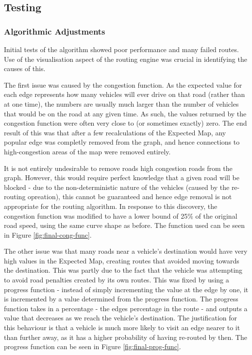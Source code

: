 \documentclass[ %
                    author={Alexander Hill},
                supervisor={Dr. Benjamin Sach},
                    degree={MEng},
                     title={MARMOSET},
                  subtitle={Multi-Agent Route Management using Online Simulation for Efficient Transportation},
                      type={research},
                      year={2016} ]{dissertation}
\begin{document}
\subsection{Testing}

\subsubsection{Algorithmic Adjustments}

Initial tests of the algorithm showed poor performance and many failed routes.
Use of the visualisation aspect of the routing engine was crucial in identifying
the causes of this.

The first issue was caused by the congestion function. As the expected value for
each edge represents how many vehicles will ever drive on that road (rather than
at one time), the numbers are usually much larger than the number of vehicles
that would be on the road at any given time. As such, the values returned by the
congestion function were often very close to (or sometimes exactly) zero. The
end result of this was that after a few recalculations of the Expected Map, any
popular edge was completly removed from the graph, and hence connections to
high-congestion areas of the map were removed entirely.

It is not entirely undesirable to remove roads high congestion roads from the
graph. However, this would require perfect knowledge that a given road will be
blocked - due to the non-deterministic nature of the vehicles (caused by the
re-routing opreation), this cannot be guaranteed and hence edge removal is not
appropriate for the routing algorithm. In response to this discovery, the
congestion function was modified to have a lower bound of 25\% of the original
road speed, using the same curve shape as before. The function used can be seen
in Figure \ref{fig:final-cong-func}.

The other issue was that many roads near a vehicle's destination would have very
high values in the Expected Map, creating routes that avoided moving towards the
destination. This was partly due to the fact that the vehicle was attempting to
avoid road penalties created by its own routes. This was fixed by using a
progress function - instead of simply incrementing the value at the edge by one,
it is incremented by a value determined from the progress function. The progress
function takes in a percentage - the edges percentage in the route - and outputs
a value that decreases as we reach the vehicle's destination. The justification
for this behaviour is that a vehicle is much more likely to visit an edge nearer
to it than further away, as it has a higher probability of having re-routed by
then. The progress function can be seen in Figure \ref{fig:final-prog-func}.
\end{document}
